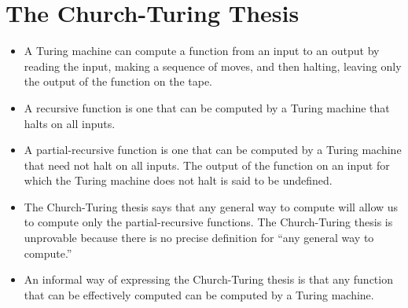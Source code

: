 \documentclass[]{article}
\begin{document}
\section{The Church-Turing Thesis}
  \begin{itemize}
    \item A Turing machine can compute a function from an input to an output by
    reading the input, making a sequence of moves, and then halting, leaving
    only the output of the function on the tape.
    \item A recursive function is one that can be computed by a Turing machine
    that halts on all inputs.
    \item A partial-recursive function is one that can be computed by a Turing
    machine that need not halt on all inputs. The output of the function on an
    input for which the Turing machine does not halt is said to be undefined.
    \item The Church-Turing thesis says that any general way to compute will
    allow us to compute only the partial-recursive functions. The Church-Turing 
    thesis is unprovable because there is no precise definition for ``any
    general way to compute.''
    \item An informal way of expressing the Church-Turing thesis is that any
    function that can be effectively computed can be computed by a Turing
    machine.
  \end{itemize}
\end{document}
